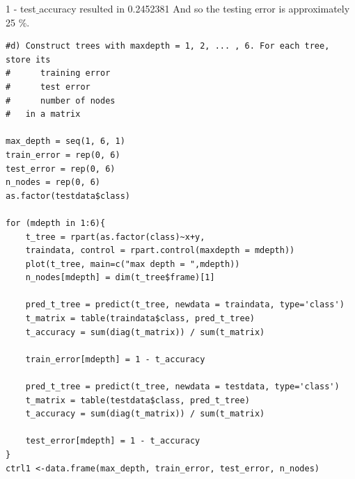 \documentclass[11pt]{article}
\begin{document}
1 - test$\_$accuracy resulted in 
0.2452381
And so the testing error is approximately 25 \%.
\begin{Verbatim}
#d) Construct trees with maxdepth = 1, 2, ... , 6. For each tree, store its
#      training error
#      test error
#      number of nodes
#   in a matrix

max_depth = seq(1, 6, 1)
train_error = rep(0, 6)
test_error = rep(0, 6)
n_nodes = rep(0, 6)
as.factor(testdata$class)

for (mdepth in 1:6){
	t_tree = rpart(as.factor(class)~x+y, 
	traindata, control = rpart.control(maxdepth = mdepth))
    plot(t_tree, main=c("max depth = ",mdepth))
    n_nodes[mdepth] = dim(t_tree$frame)[1]

    pred_t_tree = predict(t_tree, newdata = traindata, type='class')
    t_matrix = table(traindata$class, pred_t_tree)
    t_accuracy = sum(diag(t_matrix)) / sum(t_matrix)

    train_error[mdepth] = 1 - t_accuracy

    pred_t_tree = predict(t_tree, newdata = testdata, type='class')
    t_matrix = table(testdata$class, pred_t_tree)
    t_accuracy = sum(diag(t_matrix)) / sum(t_matrix)

    test_error[mdepth] = 1 - t_accuracy
}
ctrl1 <-data.frame(max_depth, train_error, test_error, n_nodes)
\end{Verbatim}
\end{document}
